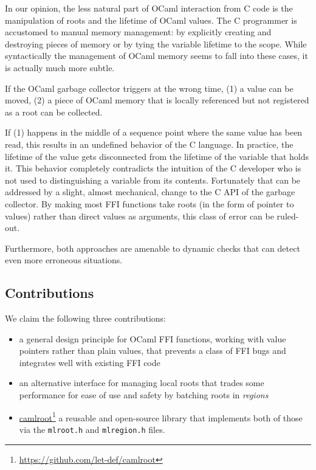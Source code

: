\documentclass[a4paper]{easychair}
\newcommand{\cpp}[1]{\lstinline[style=C++]{#1}}
\newcommand\fnurl[2]{%
\href{#2}{#1}\footnote{\url{#2}}%
}
\begin{document}
In our opinion, the less natural part of OCaml interaction from C code
is the manipulation of roots and the lifetime of OCaml values. The C
programmer is accustomed to manual memory management: by explicitly
creating and destroying pieces of memory or by tying the variable
lifetime to the scope. While syntactically the management of OCaml
memory seems to fall into these cases, it is actually much more subtle.

If the OCaml garbage collector triggers at the wrong time, (1) a value
can be moved, (2) a piece of OCaml memory that is locally referenced
but not registered as a root can be collected.

If (1) happens in the middle of a sequence point %
where the same value has been read, this results in an undefined behavior of
the C language. In practice, the lifetime of the value gets disconnected from
the lifetime of the variable that holds it.  This behavior completely
contradicts the intuition of the C developer who is not used to distinguishing
a variable from its contents.  Fortunately that can be addressed by a slight,
almost mechanical, change to the C API of the garbage collector. By making most
FFI functions take roots (in the form of pointer to values) rather than direct
values as arguments, this class of error can be ruled-out.

Furthermore, both approaches are amenable to dynamic checks that can detect even
more erroneous situations.

\subsection{Contributions}

We claim the following three contributions:
%
\begin{itemize}
\item a general design principle for OCaml FFI functions, working with value
      pointers rather than plain values, that prevents a class of FFI bugs and
      integrates well with existing FFI code
\item an alternative interface for managing local roots that trades some
      performance for ease of use and safety by batching roots in
      {\em regions}
\item \fnurl{camlroot}{https://github.com/let-def/camlroot} a reusable and
      open-source library that implements both of those via the \cpp{mlroot.h}
      and \cpp{mlregion.h} files.
\end{itemize}
\end{document}
